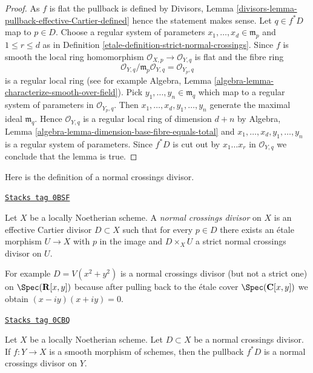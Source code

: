 \begin{proof}

As $f$ is flat the pullback is defined by
Divisors, Lemma \ref{divisors-lemma-pullback-effective-Cartier-defined}
hence the statement makes sense.
Let $q \in f^*D$ map to $p \in D$. Choose a regular system
of parameters $x_1, \ldots, x_d \in \mathfrak m_p$
and $1 \leq r \leq d$ as in
Definition \ref{etale-definition-strict-normal-crossings}.
Since $f$ is smooth the local ring homomorphism
$\mathcal{O}_{X, p} \to \mathcal{O}_{Y, q}$ is flat
and the fibre ring
$$
\mathcal{O}_{Y, q}/\mathfrak m_p \mathcal{O}_{Y, q} =
\mathcal{O}_{Y_p, q}
$$
is a regular local ring (see for example
Algebra, Lemma \ref{algebra-lemma-characterize-smooth-over-field}).
Pick $y_1, \ldots, y_n \in \mathfrak m_q$ which map to a regular
system of parameters in $\mathcal{O}_{Y_p, q}$.
Then $x_1, \ldots, x_d, y_1, \ldots, y_n$ generate the
maximal ideal $\mathfrak m_q$. Hence $\mathcal{O}_{Y, q}$
is a regular local ring of dimension
$d + n$ by Algebra, Lemma \ref{algebra-lemma-dimension-base-fibre-equals-total}
and $x_1, \ldots, x_d, y_1, \ldots, y_n$
is a regular system of parameters. Since $f^*D$ is cut
out by $x_1 \ldots x_r$ in $\mathcal{O}_{Y, q}$ we conclude
that the lemma is true.
\end{proof}

Here is the definition of a normal crossings divisor.

\begin{definition}
\label{etale-definition-normal-crossings}
\href{https://stacks.math.columbia.edu/tag/0BSF}{\texttt{Stacks tag 0BSF}}

Let $X$ be a locally Noetherian scheme. A {\it normal crossings divisor}
on $X$ is an effective Cartier divisor $D \subset X$ such that for
every $p \in D$ there exists an \'etale morphism $U \to X$ with
$p$ in the image and $D \times_X U$ a
strict normal crossings divisor on $U$.
\end{definition}

For example $D = V(x^2 + y^2)$ is a normal crossings divisor
(but not a strict one) on
$\Spec(\mathbf{R}[x, y])$ because after pulling back to
the \'etale cover $\Spec(\mathbf{C}[x, y])$ we obtain $(x - iy)(x + iy) = 0$.

\begin{lemma}
\label{etale-lemma-smooth-pullback-normal-crossings}
\href{https://stacks.math.columbia.edu/tag/0CBQ}{\texttt{Stacks tag 0CBQ}}


Let $X$ be a locally Noetherian scheme. Let $D \subset X$ be a
normal crossings divisor. If $f : Y \to X$ is a smooth
morphism of schemes, then the pullback $f^*D$ is a
normal crossings divisor on $Y$.
\end{lemma}

